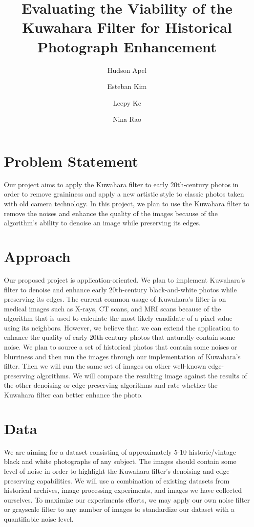 \documentclass[10pt,twocolumn,letterpaper]{article}
\begin{document}
\title{ Evaluating the Viability of the Kuwahara Filter for Historical Photograph Enhancement}

\author{Hudson Apel
\and
Esteban Kim
\and
Leepy Kc
\and
Nina Rao
}
\maketitle

\section{Problem Statement}
Our project aims to apply the Kuwahara filter to early 20th-century photos in order to remove graininess and apply a new artistic style to classic photos taken with old camera technology. In this project, we plan to use the Kuwahara filter to remove the noises and enhance the quality of the images because of the algorithm's ability to denoise an image while preserving its edges.

\section{Approach}
Our proposed project is application-oriented. We plan to implement Kuwahara’s filter to denoise and enhance early 20th-century black-and-white photos while preserving its edges. The current common usage of Kuwahara’s filter is on medical images such as X-rays, CT scans, and MRI scans because of the algorithm that is used to calculate the most likely candidate of a pixel value using its neighbors. However, we believe that we can extend the application to enhance the quality of early 20th-century photos that naturally contain some noise. We plan to source a set of historical photos that contain some noises or blurriness and then run the images through our implementation of Kuwahara’s filter. Then we will run the same set of images on other well-known edge-preserving algorithms. We will compare the resulting image against the results of the other denoising or edge-preserving algorithms and rate whether the Kuwahara filter can better enhance the photo.

\section{Data}
We are aiming for a dataset consisting of approximately 5-10 historic/vintage black and white photographs of any subject. The images should contain some level of noise in order to highlight the Kuwahara filter’s denoising and edge-preserving capabilities. We will use a combination of existing datasets from historical archives, image processing experiments, and images we have collected ourselves. To maximize our experiments efforts, we may apply our own noise filter or grayscale filter to any number of images to standardize our dataset with a quantifiable noise level.
\end{document}
